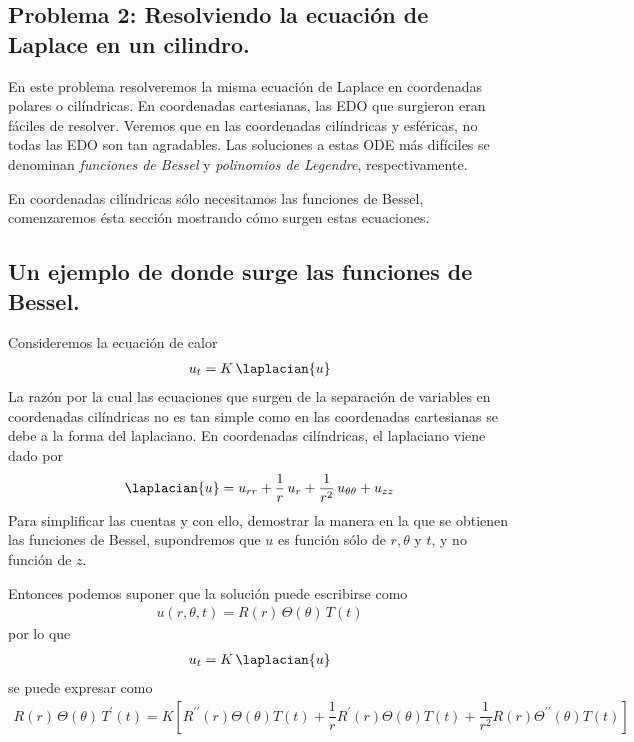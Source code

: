 \subsection{Problema 2: Resolviendo la ecuación de Laplace en un cilindro.}
En este problema resolveremos la misma ecuación de Laplace en coordenadas polares o cilíndricas. En coordenadas cartesianas, las EDO que surgieron eran fáciles de resolver. Veremos que en las coordenadas cilíndricas y esféricas, no todas las EDO son tan agradables. Las soluciones a estas ODE más difíciles se denominan \emph{funciones de Bessel} y \emph{polinomios de Legendre}, respectivamente.
\par
En coordenadas cilíndricas sólo necesitamos las funciones de Bessel, comenzaremos ésta sección mostrando cómo surgen estas ecuaciones.
\subsection*{Un ejemplo de donde surge las funciones de Bessel.}
Consideremos la ecuación de calor
\begin{align*}
u_{t} = K \, \laplacian{u}
\end{align*}
La razón por la cual las ecuaciones que surgen de la separación de variables en coordenadas cilíndricas no es tan simple como en las coordenadas cartesianas se debe a la forma del laplaciano. En coordenadas cilíndricas, el laplaciano viene dado por
\begin{align*}
\laplacian{u} = u_{r r} + \dfrac{1}{r} \, u_{r} + \dfrac{1}{r^{2}} \, u_{\theta \theta} + u_{z z}
\end{align*}
Para simplificar las cuentas y con ello, demostrar la manera en la que se obtienen las funciones de Bessel, supondremos que $u$ es función sólo de $r, \theta$ y $t$, y no función de $z$.
\par
Entonces podemos suponer que la solución puede escribirse como
\begin{align*}
u (r, \theta, t) = R (r) \, \Theta (\theta) \, T (t)
\end{align*}
por lo que
\begin{align*}
u_{t} = K \, \laplacian{u}
\end{align*}
se puede expresar como
\begin{align*}
R (r) \, \Theta (\theta) \, T^{\prime} (t) = K \left[ R^{\prime \prime} (r) \Theta (\theta) T (t) + \dfrac{1}{r} R^{\prime} (r) \Theta (\theta) T (t) + \dfrac{1}{r^{2}} R (r) \Theta^{\prime \prime} (\theta) T (t) \right]
\end{align*}
